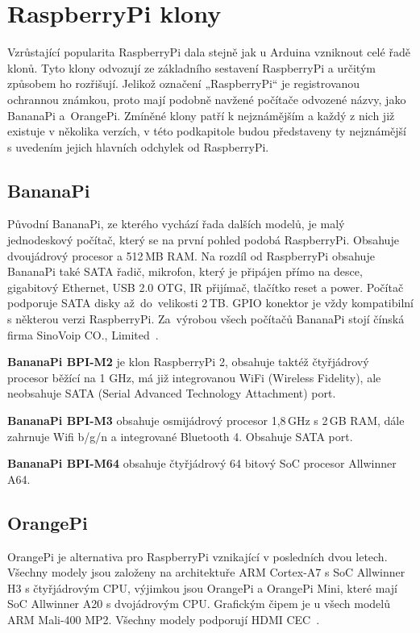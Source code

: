 \section{RaspberryPi klony}
\label{KapRaspiKlony}

Vzrůstající popularita RaspberryPi dala stejně jak u Arduina vzniknout celé řadě klonů. Tyto klony odvozují ze základního sestavení RaspberryPi a určitým způsobem ho rozřišují. Jelikož označení „RaspberryPi“ je registrovanou ochrannou známkou, proto mají podobně navžené počítače odvozené názvy, jako BananaPi a~OrangePi. Zmíněné klony patří k nejznámějším a každý z nich již existuje v několika verzích, v této podkapitole budou představeny ty nejznámější s uvedením jejich hlavních odchylek od RaspberryPi.

	\subsection{BananaPi}
		Původní BananaPi, ze kterého vychází řada dalších modelů, je malý jednodeskový počítač, který se na první pohled podobá RaspberryPi.  Obsahuje dvoujádrový procesor a 512\,MB RAM. Na rozdíl od RaspberryPi obsahuje BananaPi také SATA řadič, mikrofon, který je připájen přímo na desce, gigabitový Ethernet, USB 2.0 OTG, IR přijímač, tlačítko reset a power. Počítač podporuje SATA disky až~do~velikosti 2\,TB. GPIO konektor je vždy kompatibilní s některou verzi RaspberryPi. Za~výrobou všech počítačů BananaPi stojí čínská firma SinoVoip CO., Limited~\cite{BananaPi}.
		
	\textbf{BananaPi BPI-M2} je klon RaspberryPi 2, obsahuje taktéž čtyřjádrový procesor běžící na 1 GHz, má již integrovanou WiFi (Wireless Fidelity), ale neobsahuje SATA (Serial Advanced Technology Attachment) port.
	
	\textbf{BananaPi BPI-M3} obsahuje osmijádrový procesor 1,8\,GHz s 2\,GB RAM, dále zahrnuje Wifi b/g/n a integrované Bluetooth 4. Obsahuje SATA port.
	
	\textbf{BananaPi BPI-M64} obsahuje čtyřjádrový 64 bitový SoC procesor Allwinner A64.
	
	\subsection{OrangePi}
	OrangePi je alternativa pro RaspberryPi vznikající v posledních dvou letech. Všechny modely jsou založeny na architektuře ARM Cortex-A7 s SoC Allwinner H3 s čtyřjádrovým CPU, výjimkou jsou OrangePi a OrangePi Mini, které mají SoC Allwinner A20 s dvojádrovým CPU. Grafickým čipem je u všech modelů ARM Mali-400 MP2. Všechny modely podporují HDMI CEC~\cite{OrangePi}.

